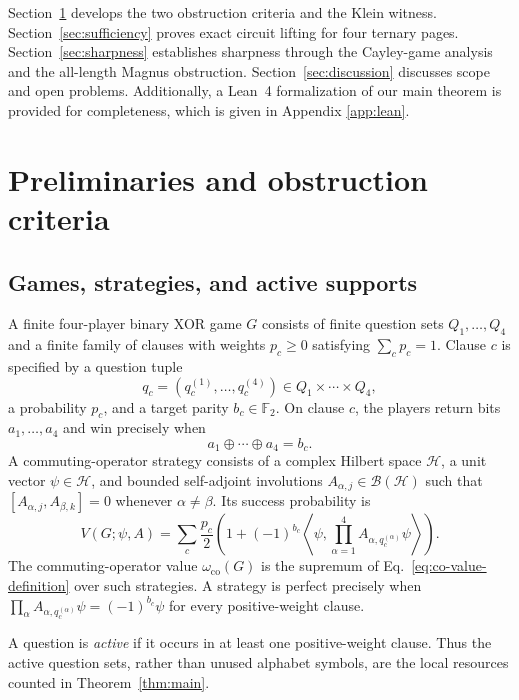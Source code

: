 \documentclass[11pt]{article}
\theoremstyle{definition}
\theoremstyle{remark}
\newcommand{\co}{\mathrm{co}}
\numberwithin{equation}{section}
\begin{document}
Section~\ref{sec:preliminaries} develops the two obstruction criteria and the
Klein witness.  Section~\ref{sec:sufficiency} proves exact circuit lifting for
four ternary pages.  Section~\ref{sec:sharpness} establishes sharpness through
the Cayley-game analysis and the all-length Magnus obstruction.
Section~\ref{sec:discussion} discusses scope and open problems. Additionally, a Lean~4 formalization of our main theorem is provided for completeness, which is given in Appendix \ref{app:lean}.

\section{Preliminaries and obstruction criteria}\label{sec:preliminaries}

\subsection{Games, strategies, and active supports}

A finite four-player binary XOR game \(G\) consists of finite question sets
\(Q_1,\ldots,Q_4\) and a finite family of clauses with weights \(p_c\geq0\)
satisfying \(\sum_c p_c=1\).  Clause \(c\) is specified
by a question tuple
\[
  q_c=(q_c^{(1)},\ldots,q_c^{(4)})
  \in Q_1\times\cdots\times Q_4,
\]
a probability \(p_c\), and a target parity \(b_c\in\mathbb F_2\).  On clause
\(c\), the players return bits \(a_1,\ldots,a_4\) and win precisely when
\[
  a_1\oplus\cdots\oplus a_4=b_c.
\]
A commuting-operator strategy consists of a complex Hilbert space
\(\mathcal H\), a unit vector \(\psi\in\mathcal H\), and bounded
self-adjoint involutions \(A_{\alpha,j}\in\mathcal B(\mathcal H)\) such that
\([A_{\alpha,j},A_{\beta,k}]=0\) whenever \(\alpha\ne\beta\).  Its success
probability is
\begin{equation}\label{eq:co-value-definition}
 V(G;\psi,A)=\sum_c\frac{p_c}{2}
 \left(1+(-1)^{b_c}
 \left\langle\psi,
 \prod_{\alpha=1}^{4}A_{\alpha,q_c^{(\alpha)}}\psi
 \right\rangle\right).
\end{equation}
The commuting-operator value \(\omega_{\co}(G)\) is the supremum of
Eq.~\eqref{eq:co-value-definition} over such strategies.  A strategy is
perfect precisely when
\(\prod_\alpha A_{\alpha,q_c^{(\alpha)}}\psi=(-1)^{b_c}\psi\) for every
positive-weight clause.

A question is \emph{active} if it occurs in at least one positive-weight
clause.  Thus the active question sets, rather than unused alphabet symbols,
are the local resources counted in Theorem~\ref{thm:main}.
\end{document}
